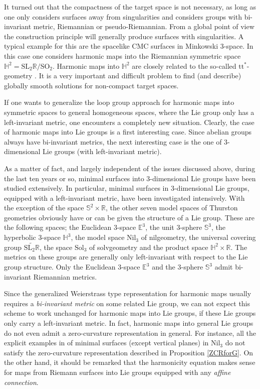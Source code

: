 \documentclass[12pt]{amsart}
\theoremstyle{definition}
\theoremstyle{remark}
\numberwithin{equation}{section}
\begin{document}
 It turned out that the compactness of the target space is not
 necessary, as long as one only considers surfaces away from singularities and considers
 groups with bi-invariant metric, Riemannian or pseudo-Riemannian. 
 From a global point of view the construction principle will generally
 produce surfaces with singularities.
 A typical example for this are the spacelike CMC surfaces in 
 Minkowski 3-space. 
 In this case one considers harmonic maps into the 
 Riemannian symmetric space
 $\mathbb{H}^2=\mathrm{SL}_{2}\mathbb{R}/\mathrm{SO}_2$. 
 Harmonic maps into $\mathbb{H}^2$ are closely related to the so-called  
 $\mathrm{tt}^*$-geometry \cite{DGR}. 
 It is a very important and difficult problem to find (and describe) globally smooth
 solutions for non-compact target spaces.

 If one wants to generalize the loop group approach for 
 harmonic maps into symmetric spaces to general homogeneous 
 spaces, where the Lie group 
 only has a left-invariant metric, one encounters a 
 completely new situation.
 Clearly, the case of harmonic maps into Lie groups is a 
 first interesting case. Since abelian groups always have 
 bi-invariant metrics, the next interesting case is the one 
 of $3$-dimensional Lie groups (with left-invariant metric).

 As a matter of fact, and 
 largely independent of the issues discussed above,
 during the last ten years or so, minimal surfaces into $3$-dimensional Lie
 groups have been studied extensively. In particular, minimal surfaces in
 3-dimensional Lie groups, equipped with a left-invariant metric,
 have been investigated intensively.
 With the exception of the space $\mathbb{S}^2\times\mathbb{R}$,  the other seven 
 model spaces of Thurston geometries obviously have or can be given the
 structure of a Lie group. These are the following spaces; 
 the Euclidean $3$-space $\mathbb{E}^3$, 
 the unit $3$-sphere $\mathbb{S}^3$, 
 the hyperbolic $3$-space $\mathbb{H}^3$, 
 the model space $\mathrm{Nil}_3$
 of nilgeometry, the universal covering group
 $\widetilde{\mathrm{SL}_2\mathbb{R}}$,
 the space $\mathrm{Sol}_3$ of solvgeometry and the product space
 $\mathbb{H}^2\times \mathbb{R}$.
 The metrics on these groups  are generally only left-invariant
 with respect to the Lie group structure. Only
 the  Euclidean $3$-space $\mathbb{E}^3$ and the 
 $3$-sphere $\mathbb{S}^3$ admit bi-invariant Riemannian metrics.

 Since the generalized Weierstrass type representation for
 harmonic maps usually requires a {\it bi-invariant metric} on 
 some related Lie group,
 we can not expect this scheme to work unchanged 
for harmonic maps into Lie
 groups,
 if these Lie groups only carry a left-invariant metric.
 In fact, harmonic maps into general Lie groups do not even admit a
 zero-curvature
 representation in general.
 For instance, 
 all the explicit examples  in \cite{DIK2} of minimal 
 surfaces (except vertical planes) in $\mathrm{Nil}_3$ do not satisfy
 the zero-curvature representation described 
 in Proposition \ref{ZCRforG}.
 On the other hand, it should be remarked that the
 harmonicity equation makes sense for maps from
 Riemann surfaces into Lie groups equipped with any {\it affine connection}.
\end{document}
